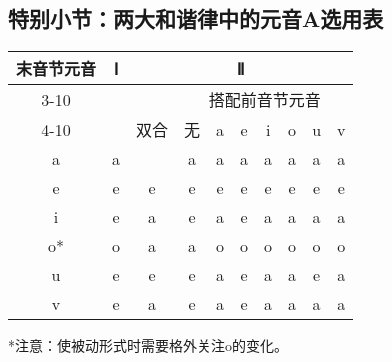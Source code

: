 \subsection{特别小节：两大和谐律中的元音A选用表}

\begin{center}
    \begin{tabular}{c|c|c|c|c|c|c|c|c|c}
        \toprule
        \multirow{4}{*}{末音节元音} & \multirow{4}{*}{Ⅰ} & \multicolumn{8}{c}{Ⅱ} \\
        \cline{3-10} 
        & & \multirow{3}{*}{双合} & \multicolumn{7}{c}{搭配前音节元音} \\ 
        \cline{4-10} 
        & & & 无 & a & e & i & o & u & v \\\midrule
        a & \cellcolor{cyan} a & \cellcolor{cyan} a & \cellcolor{cyan} a & \cellcolor{cyan} a & \cellcolor{cyan} a & \cellcolor{cyan} a & \cellcolor{cyan} a & \cellcolor{cyan} a & \cellcolor{cyan} a \\\hline
        e & \cellcolor{lime} e & \cellcolor{lime} e & \cellcolor{lime} e & \cellcolor{lime} e & \cellcolor{lime} e & \cellcolor{lime} e & \cellcolor{lime} e & \cellcolor{lime} e & \cellcolor{lime} e \\\hline
        i & \cellcolor{lime} e & \cellcolor{cyan} a & \cellcolor{lime} e & \cellcolor{cyan} a & \cellcolor{lime} e & \cellcolor{cyan} a & \cellcolor{cyan} a & \cellcolor{cyan} a & \cellcolor{cyan} a \\\hline
        o* & \cellcolor{pink} o & \cellcolor{cyan} a & \cellcolor{cyan} a & \cellcolor{pink} o & \cellcolor{pink} o & \cellcolor{pink} o & \cellcolor{pink} o & \cellcolor{pink} o & \cellcolor{pink} o \\\hline
        u & \cellcolor{lime} e & \cellcolor{lime} e & \cellcolor{lime} e & \cellcolor{cyan} a & \cellcolor{lime} e & \cellcolor{cyan} a & \cellcolor{cyan} a & \cellcolor{lime} e & \cellcolor{cyan} a \\\hline
        v & \cellcolor{lime} e & \cellcolor{cyan} a & \cellcolor{lime} e & \cellcolor{cyan} a & \cellcolor{lime} e & \cellcolor{cyan} a & \cellcolor{cyan} a & \cellcolor{cyan} a & \cellcolor{cyan} a \\\bottomrule
    \end{tabular}
    
    *注意：使被动形式时需要格外关注o的变化。
\end{center}

